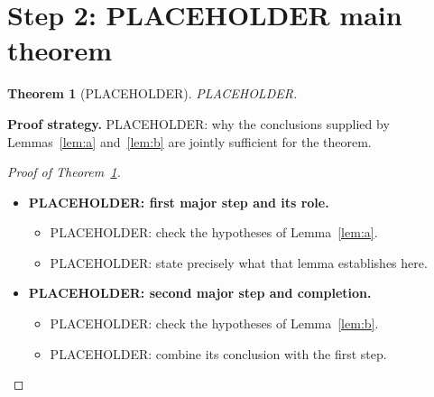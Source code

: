 \documentclass[12pt]{article}
\newtheorem{theorem}{Theorem}
\theoremstyle{remark}
\begin{document}
\clearpage
\section{Step 2: PLACEHOLDER main theorem}



\begin{theorem}[PLACEHOLDER]\label{thm:main}
PLACEHOLDER.
\end{theorem}

\textbf{Proof strategy.} PLACEHOLDER: why the conclusions supplied by
Lemmas~\ref{lem:a} and~\ref{lem:b} are jointly sufficient for the theorem.

\begin{proof}[Proof of Theorem~\ref{thm:main}]
\leavevmode\par
\begin{itemize}
  \item \textbf{PLACEHOLDER: first major step and its role.}
    \begin{itemize}
      \item PLACEHOLDER: check the hypotheses of Lemma~\ref{lem:a}.
      \item PLACEHOLDER: state precisely what that lemma establishes here.
    \end{itemize}
  \item \textbf{PLACEHOLDER: second major step and completion.}
    \begin{itemize}
      \item PLACEHOLDER: check the hypotheses of Lemma~\ref{lem:b}.
      \item PLACEHOLDER: combine its conclusion with the first step. \qedhere
    \end{itemize}
\end{itemize}
\end{proof}

\clearpage
\end{document}
